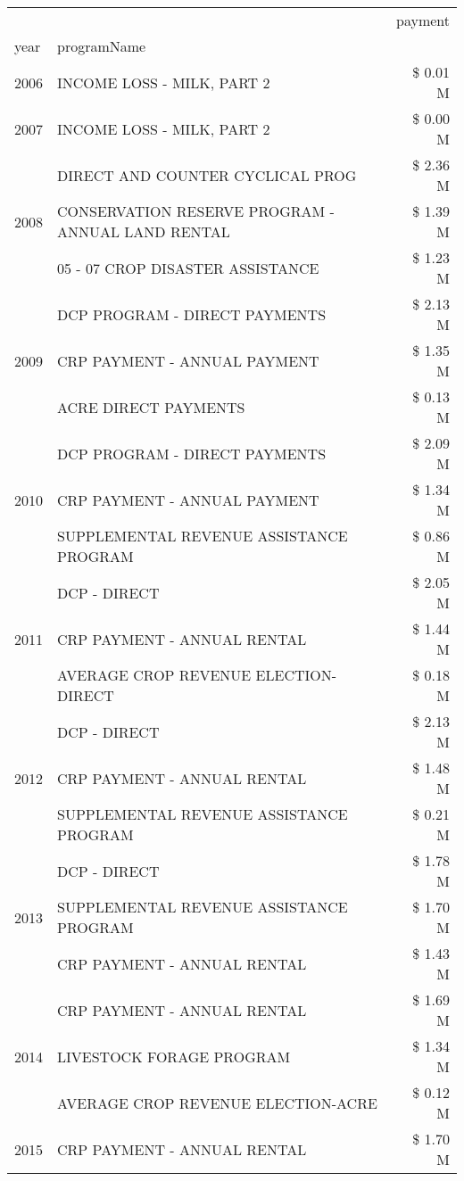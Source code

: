 \begin{tabular}{llr}
\toprule
 &  & payment \\
year & programName &  \\
\midrule
2006 & INCOME LOSS - MILK, PART 2 & \$ 0.01 M \\
\cline{1-3}
2007 & INCOME LOSS - MILK, PART 2 & \$ 0.00 M \\
\cline{1-3}
\multirow[t]{3}{*}{2008} & DIRECT AND COUNTER CYCLICAL PROG & \$ 2.36 M \\
 & CONSERVATION RESERVE PROGRAM - ANNUAL LAND RENTAL & \$ 1.39 M \\
 & 05 - 07 CROP DISASTER ASSISTANCE & \$ 1.23 M \\
\cline{1-3}
\multirow[t]{3}{*}{2009} & DCP PROGRAM - DIRECT PAYMENTS & \$ 2.13 M \\
 & CRP PAYMENT - ANNUAL PAYMENT & \$ 1.35 M \\
 & ACRE DIRECT PAYMENTS & \$ 0.13 M \\
\cline{1-3}
\multirow[t]{3}{*}{2010} & DCP PROGRAM - DIRECT PAYMENTS & \$ 2.09 M \\
 & CRP PAYMENT - ANNUAL PAYMENT & \$ 1.34 M \\
 & SUPPLEMENTAL REVENUE ASSISTANCE PROGRAM & \$ 0.86 M \\
\cline{1-3}
\multirow[t]{3}{*}{2011} & DCP - DIRECT & \$ 2.05 M \\
 & CRP PAYMENT - ANNUAL RENTAL & \$ 1.44 M \\
 & AVERAGE CROP REVENUE ELECTION-DIRECT & \$ 0.18 M \\
\cline{1-3}
\multirow[t]{3}{*}{2012} & DCP - DIRECT & \$ 2.13 M \\
 & CRP PAYMENT - ANNUAL RENTAL & \$ 1.48 M \\
 & SUPPLEMENTAL REVENUE ASSISTANCE PROGRAM & \$ 0.21 M \\
\cline{1-3}
\multirow[t]{3}{*}{2013} & DCP - DIRECT & \$ 1.78 M \\
 & SUPPLEMENTAL REVENUE ASSISTANCE PROGRAM & \$ 1.70 M \\
 & CRP PAYMENT - ANNUAL RENTAL & \$ 1.43 M \\
\cline{1-3}
\multirow[t]{3}{*}{2014} & CRP PAYMENT - ANNUAL RENTAL & \$ 1.69 M \\
 & LIVESTOCK FORAGE PROGRAM & \$ 1.34 M \\
 & AVERAGE CROP REVENUE ELECTION-ACRE & \$ 0.12 M \\
\cline{1-3}
\multirow[t]{3}{*}{2015} & CRP PAYMENT - ANNUAL RENTAL & \$ 1.70 M \\

\end{tabular}
